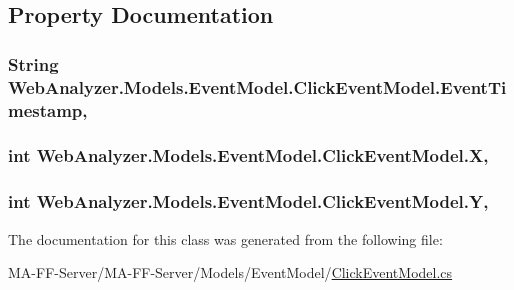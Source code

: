 \subsection{Property Documentation}
\hypertarget{class_web_analyzer_1_1_models_1_1_event_model_1_1_click_event_model_aa41e2fba46ac94e35b54c5129506aa24}{}
\subsubsection[{Event\+Timestamp}]{\setlength{\rightskip}{0pt plus 5cm}String Web\+Analyzer.\+Models.\+Event\+Model.\+Click\+Event\+Model.\+Event\+Timestamp\hspace{0.3cm}{\ttfamily [get]}, {\ttfamily [set]}}\label{class_web_analyzer_1_1_models_1_1_event_model_1_1_click_event_model_aa41e2fba46ac94e35b54c5129506aa24}
\hypertarget{class_web_analyzer_1_1_models_1_1_event_model_1_1_click_event_model_a6d3d1e265eda3d709b09df33b60188f1}{}
\subsubsection[{X}]{\setlength{\rightskip}{0pt plus 5cm}int Web\+Analyzer.\+Models.\+Event\+Model.\+Click\+Event\+Model.\+X\hspace{0.3cm}{\ttfamily [get]}, {\ttfamily [set]}}\label{class_web_analyzer_1_1_models_1_1_event_model_1_1_click_event_model_a6d3d1e265eda3d709b09df33b60188f1}
\hypertarget{class_web_analyzer_1_1_models_1_1_event_model_1_1_click_event_model_a304a5fe726ae3cfc26cc7659315ca7eb}{}
\subsubsection[{Y}]{\setlength{\rightskip}{0pt plus 5cm}int Web\+Analyzer.\+Models.\+Event\+Model.\+Click\+Event\+Model.\+Y\hspace{0.3cm}{\ttfamily [get]}, {\ttfamily [set]}}\label{class_web_analyzer_1_1_models_1_1_event_model_1_1_click_event_model_a304a5fe726ae3cfc26cc7659315ca7eb}


The documentation for this class was generated from the following file\+:\begin{DoxyCompactItemize}
\item 
M\+A-\/\+F\+F-\/\+Server/\+M\+A-\/\+F\+F-\/\+Server/\+Models/\+Event\+Model/\hyperlink{_click_event_model_8cs}{Click\+Event\+Model.\+cs}\end{DoxyCompactItemize}
